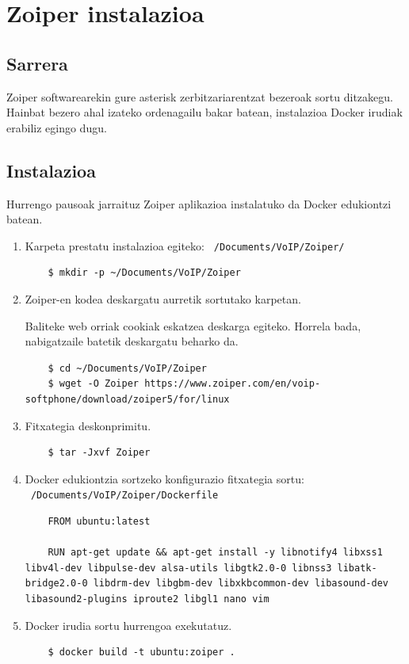\chapter[Zoiper instalazioa]{Zoiper instalazioa}
\label{chp:zoiper-install}

\localtableofcontents

\section{Sarrera}

Zoiper softwarearekin gure asterisk zerbitzariarentzat bezeroak sortu ditzakegu. Hainbat bezero ahal izateko ordenagailu bakar batean, instalazioa Docker irudiak erabiliz egingo dugu.

\section{Instalazioa}

Hurrengo pausoak jarraituz Zoiper aplikazioa instalatuko da Docker edukiontzi batean.
\begin{enumerate}
    \item Karpeta prestatu instalazioa egiteko: \texttt{~/Documents/VoIP/Zoiper/}
    \begin{verbatim}
    $ mkdir -p ~/Documents/VoIP/Zoiper
    \end{verbatim}
    \item Zoiper-en kodea deskargatu aurretik sortutako karpetan.
    \begin{important}
        Baliteke web orriak cookiak eskatzea deskarga egiteko. Horrela bada, nabigatzaile batetik deskargatu beharko da.
    \end{important}
    \begin{verbatim}
    $ cd ~/Documents/VoIP/Zoiper
    $ wget -O Zoiper https://www.zoiper.com/en/voip-softphone/download/zoiper5/for/linux
    \end{verbatim}
    \item Fitxategia deskonprimitu.
    \begin{verbatim}
    $ tar -Jxvf Zoiper
    \end{verbatim}
    \item Docker edukiontzia sortzeko konfigurazio fitxategia sortu: \texttt{~/Documents/VoIP/Zoiper/Dockerfile}
    \begin{verbatim}
    FROM ubuntu:latest
    
    RUN apt-get update && apt-get install -y libnotify4 libxss1 libv4l-dev libpulse-dev alsa-utils libgtk2.0-0 libnss3 libatk-bridge2.0-0 libdrm-dev libgbm-dev libxkbcommon-dev libasound-dev libasound2-plugins iproute2 libgl1 nano vim
    \end{verbatim}
    \item Docker irudia sortu hurrengoa exekutatuz.
    \begin{verbatim}
    $ docker build -t ubuntu:zoiper .
    \end{verbatim}
\end{enumerate}


